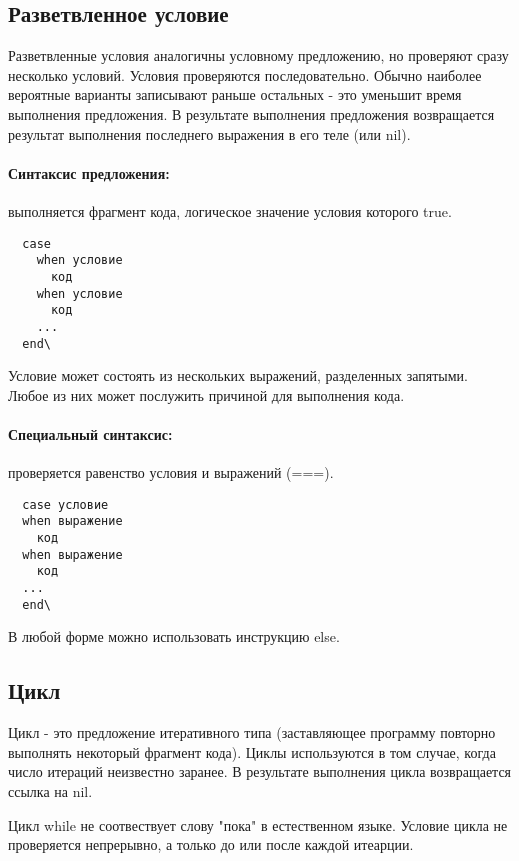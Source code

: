 \subsection{Разветвленное условие}

Разветвленные условия аналогичны условному предложению, но проверяют сразу несколько условий. Условия проверяются последовательно. Обычно наиболее вероятные варианты записывают раньше остальных - это уменьшит время выполнения предложения. В результате выполнения предложения возвращается результат выполнения последнего выражения в его теле (или nil).

\paragraph*{Синтаксис предложения:} выполняется фрагмент кода, логическое значение условия которого true.

\begin{verbatim}
  case
    when условие
      код
    when условие
      код
    ...
  end\
\end{verbatim}

Условие может состоять из нескольких выражений, разделенных запятыми. Любое из них может послужить причиной для выполнения кода.

\paragraph*{Специальный синтаксис:} проверяется равенство условия и выражений (===).

\begin{verbatim}
  case условие
  when выражение
    код
  when выражение
    код
  ...
  end\
\end{verbatim}

В любой форме можно использовать инструкцию else.

\subsection{Цикл}

Цикл - это предложение итеративного типа (заставляющее программу повторно выполнять некоторый фрагмент кода). Циклы используются в том случае, когда число итераций неизвестно заранее. В результате выполнения цикла возвращается ссылка на nil.

Цикл while не соотвествует слову "пока" в естественном языке. Условие цикла не проверяется непрерывно, а только до или после каждой итеарции.

